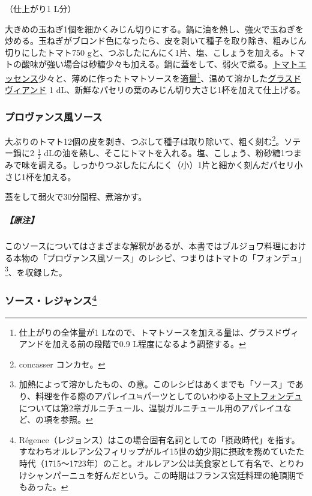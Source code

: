 \begin{recette}
（仕上がり1 L分）

大きめの玉ねぎ1個を細かくみじん切りにする。鍋に油を熱し、強火で玉ねぎを炒める。玉ねぎがブロンド色になったら、皮を剥いて種子を取り除き、粗みじん切りにしたトマト750
gと、つぶしたにんにく1片、塩、こしょうを加える。トマトの酸味が強い場合は砂糖少々も加える。鍋に蓋をして、弱火で煮る。\protect\hyperlink{essence-de-tomate}{トマトエッセンス}少々と、薄めに作ったトマトソースを適量\footnote{仕上がりの全体量が1
  Lなので、トマトソースを加える量は、グラスドヴィアンドを加える前の段階で0.9
  L程度になるよう調整する。}、温めて溶かした\protect\hyperlink{glace-de-viande}{グラスドヴィアンド}
1 dL、新鮮なパセリの葉のみじん切り大さじ1杯を加えて仕上げる。

\atoaki{}

\hypertarget{sauce-provencale}{%
\subsubsection{プロヴァンス風ソース}\label{sauce-provencale}}



大ぶりのトマト12個の皮を剥き、つぶして種子は取り除いて、粗く刻む\footnote{concasser
  コンカセ。}。ソテー鍋に2 \(\frac{1}{2}\)
dLの油を熱し、そこにトマトを入れる。塩、こしょう、粉砂糖1つまみで味を調える。しっかりつぶしたにんにく（小）1片と細かく刻んだパセリ小さじ1杯を加える。

蓋をして弱火で30分間程、煮溶かす。

\hypertarget{nota-sauce-provencale}{%
\subparagraph{【原注】}\label{nota-sauce-provencale}}

このソースについてはさまざまな解釈があるが、本書ではブルジョワ料理における本物の「プロヴァンス風ソース」のレシピ、つまりはトマトの「フォンデュ」\footnote{加熱によって溶かしたもの、の意。このレシピはあくまでも「ソース」であり、料理を作る際のアパレイユ≒パーツとしてのいわゆる\protect\hyperlink{portugaise}{トマトフォンデュ}については第2章ガルニチュール、温製ガルニチュール用のアパレイユなど、の項を参照。}、を収録した。

\atoaki{}

\hypertarget{sauce-regence}{%
\subsubsection[ソース・レジャンス]{\texorpdfstring{ソース・レジャンス\footnote{Régence（レジョンス）はこの場合固有名詞としての「摂政時代」を指す。すなわちオルレアン公フィリップがルイ15世の幼少期に摂政を務めていたた時代（1715〜1723年）のこと。オルレアン公は美食家として有名で、とりわけシャンパーニュを好んだという。この時期はフランス宮廷料理の絶頂期でもあった。}}{ソース・レジャンス}}\label{sauce-regence}}


\end{recette}
